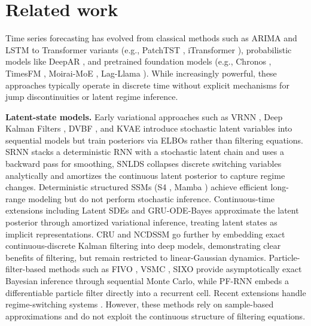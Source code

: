 \documentclass{article}
\begin{document}
\section{Related work}
Time series forecasting has evolved from classical methods such as ARIMA \citep{ho1998use} and LSTM \citep{yu2019review} to Transformer variants (e.g., PatchTST \citep{nie2023a}, iTransformer \citep{liu2024itransformer}), probabilistic models like DeepAR \citep{salinas2020deepar}, and pretrained foundation models (e.g., Chronos \citep{ansari2024chronos}, TimesFM \citep{das2024a}, Moirai-MoE \citep{liu2025moirai}, Lag-Llama \citep{rasul2023lagllama}). While increasingly powerful, these approaches typically operate in discrete time without explicit mechanisms for jump discontinuities or latent regime inference.

\textbf{Latent-state models.} Early variational approaches such as VRNN \citep{chung2015recurrent}, Deep Kalman Filters \citep{krishnan2015deep}, DVBF \citep{karl2017deep}, and KVAE \citep{fraccaro2017disentangled} introduce stochastic latent variables into sequential models but train posteriors via ELBOs rather than filtering equations. SRNN \citep{fraccaro2016sequential} stacks a deterministic RNN with a stochastic latent chain and uses a backward pass for smoothing, SNLDS \citep{dong2020collapsed} collapses discrete switching variables analytically and amortizes the continuous latent posterior to capture regime changes. Deterministic structured SSMs (S4 \citep{gu2022efficiently}, Mamba \citep{gu2024mamba}) achieve efficient long-range modeling but do not perform stochastic inference. Continuous-time extensions including Latent SDEs \citep{li2020scalable} and GRU-ODE-Bayes \citep{de2019gru} approximate the latent posterior through amortized variational inference, treating latent states as implicit representations. CRU \citep{schirmer2022modeling} and NCDSSM \citep{ansari2023neural} go further by embedding exact continuous-discrete Kalman filtering into deep models, demonstrating clear benefits of filtering, but remain restricted to linear-Gaussian dynamics. Particle-filter-based methods such as FIVO \citep{maddison2017filtering}, VSMC \citep{naesseth2018variational}, SIXO \citep{lawson2022sixo} provide asymptotically exact Bayesian inference through sequential Monte Carlo, while PF-RNN \citep{ma2020particle} embeds a differentiable particle filter directly into a recurrent cell. Recent extensions handle regime-switching systems \citep{brady2024regime}. However, these methods rely on sample-based approximations and do not exploit the continuous structure of filtering equations.
\end{document}
